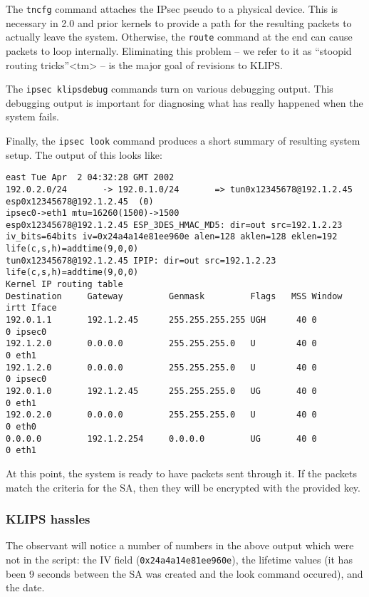 The {\tt tncfg} command attaches the IPsec pseudo to a physical device. This
is necessary in 2.0 and prior kernels to provide a path for the resulting
packets to actually leave the system. Otherwise, the {\tt route} command at
the end can cause packets to loop internally. Eliminating this problem -- 
we refer to it as ``stoopid routing tricks''<tm> -- is the major goal of
revisions to KLIPS.

The {\tt ipsec klipsdebug} commands turn on various debugging output. This
debugging output is important for diagnosing what has really happened when
the system fails.

Finally, the {\tt ipsec look} command produces a short summary of resulting
system setup. The output of this looks like:

\begin{verbatim}
east Tue Apr  2 04:32:28 GMT 2002
192.0.2.0/24       -> 192.0.1.0/24       => tun0x12345678@192.1.2.45 esp0x12345678@192.1.2.45  (0)
ipsec0->eth1 mtu=16260(1500)->1500
esp0x12345678@192.1.2.45 ESP_3DES_HMAC_MD5: dir=out src=192.1.2.23 iv_bits=64bits iv=0x24a4a14e81ee960e alen=128 aklen=128 eklen=192 life(c,s,h)=addtime(9,0,0)
tun0x12345678@192.1.2.45 IPIP: dir=out src=192.1.2.23 life(c,s,h)=addtime(9,0,0)
Kernel IP routing table
Destination     Gateway         Genmask         Flags   MSS Window  irtt Iface
192.0.1.1       192.1.2.45      255.255.255.255 UGH      40 0          0 ipsec0
192.1.2.0       0.0.0.0         255.255.255.0   U        40 0          0 eth1
192.1.2.0       0.0.0.0         255.255.255.0   U        40 0          0 ipsec0
192.0.1.0       192.1.2.45      255.255.255.0   UG       40 0          0 eth1
192.0.2.0       0.0.0.0         255.255.255.0   U        40 0          0 eth0
0.0.0.0         192.1.2.254     0.0.0.0         UG       40 0          0 eth1
\end{verbatim} 

At this point, the system is ready to have packets sent through it. If the
packets match the criteria for the SA, then they will be encrypted with the
provided key.

\subsubsection{KLIPS hassles}

The observant will notice a number of numbers in the above output which were
not in the script: the IV field ({\tt 0x24a4a14e81ee960e}), the lifetime
values (it has been 9 seconds between the SA was created and the look
command occured), and the date.

